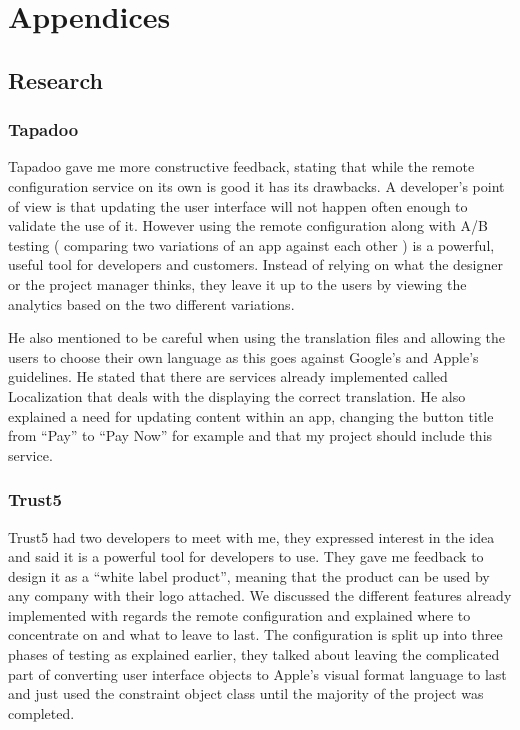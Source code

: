 \chapter{Appendices}

\section{Research}

\subsection{Tapadoo}
Tapadoo \cite{tapadoo} gave me more constructive feedback, stating that while the remote configuration service on its own is good it has its drawbacks. A developer's point of view is that updating the user interface will not happen often enough to validate the use of it. However using the remote configuration along with A/B testing ( comparing two variations of an app against each other ) is a powerful, useful tool for developers and customers. Instead of relying on what the designer or the project manager thinks, they leave it up to the users by viewing the analytics based on the two different variations.

He also mentioned to be careful when using the translation files and allowing the users to choose their own language as this goes against Google’s and Apple’s guidelines. He stated that there are services already implemented called Localization that deals with the displaying the correct translation. He also explained a need for updating content within an app, changing the button title from “Pay” to “Pay Now” for example and that my project should include this service.

\subsection{Trust5}

Trust5 \cite{trust5} had two developers to meet with me, they expressed interest in the idea and said it is a powerful tool for developers to use. They gave me feedback to design it as a “white label product”, meaning that the product can be used by any company with their logo attached. We discussed the different features already implemented with regards the remote configuration and explained where to concentrate on and what to leave to last. The configuration is split up into three phases of testing as explained earlier, they talked about leaving the complicated part of converting user interface objects to Apple’s visual format language to last and just used the constraint object class until the majority of the project was completed.


